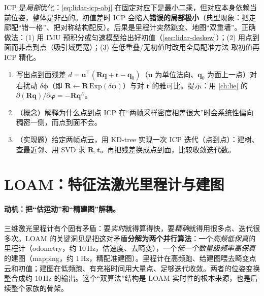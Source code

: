 \begin{pitfall}
ICP 是\emph{局部}优化：\cref{eq:lidar-icp-obj} 在固定对应下是最小二乘，但对应本身依赖当前位姿，整体是非凸的。初值差时 ICP 会陷入\textbf{错误的局部极小}（典型现象：把走廊配“错一格”、把对称结构配反）。后果是里程计突然跳变、地图“双重墙”。正确做法：(1) 用 IMU 预积分或匀速模型给出好初值（\cref{sec:lidar-deskew}）；(2) 用点到面而非点到点（吸引域更宽）；(3) 在低重叠/无初值时改用全局配准方法\cite{yang2020teaser} 取初值再 ICP 精化。
\end{pitfall}

\begin{practice}
\begin{enumerate}
  \item 写出点到面残差 $d=\mathbf{u}^\top(\mathbf{R}\mathbf{q}+\mathbf{t}-\mathbf{q}_0)$（$\mathbf{u}$ 为单位法向、$\mathbf{q}_0$ 为面上一点）对右扰动 $\delta\boldsymbol{\phi}$（即 $\mathbf{R}\leftarrow\mathbf{R}\,\mathrm{Exp}(\delta\boldsymbol{\phi})$）与对 $\mathbf{t}$ 的雅可比。提示：用 \cref{ch:lie} 的 $\partial(\mathbf{R}\mathbf{q})/\partial\boldsymbol{\varphi}=-\mathbf{R}\mathbf{q}^\wedge$。
  \item （概念）解释为什么点到点 ICP 在“两帧采样密度相差很大”时会系统性偏向稠密一侧，而点到面不会。
  \item （实现题）给定两帧点云，用 KD-tree 实现一次 ICP 迭代（点到点）：建树、查最近邻、用 SVD 求 $\mathbf{R},\mathbf{t}$。再把残差换成点到面，比较收敛迭代数。
\end{enumerate}
\end{practice}

\section{LOAM：特征法激光里程计与建图}
\label{sec:lidar-loam}

\paragraph{动机：把“估运动”和“精建图”解耦。}
三维激光里程计有个固有矛盾：要\emph{实时}就得算得快，要\emph{精确}就得用很多点、迭代很多次。LOAM\cite{zhang2014loam} 的关键洞见是把这对矛盾\textbf{分解为两个并行算法}：一个\emph{高频低保真}的里程计（odometry，约 $10$\,Hz，估速度、去畸变），一个\emph{低一个数量级频率高保真}的建图（mapping，约 $1$\,Hz，精配准建图）。里程计在高频跑、给建图喂去畸变点云和初值；建图在低频跑、有充裕时间用大量点、足够迭代收敛。两者的位姿变换整合成约 $10$\,Hz 的输出。这个“双算法”结构是 LOAM 实时性的根本来源，也是后续整个家族的骨架。

